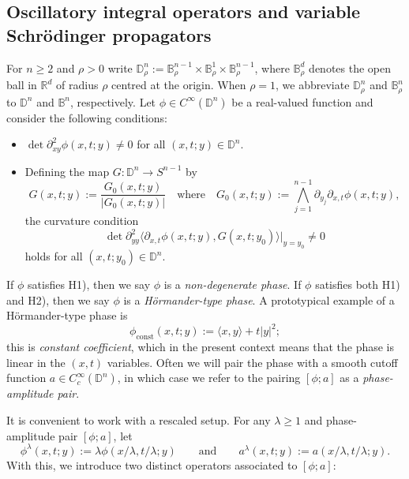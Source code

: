 \documentclass[reqno]{amsart}
\numberwithin{equation}{section}
\newcommand{\B}{\mathbb{B}}
\newcommand{\D}{\mathbb{D}}
\newcommand{\R}{\mathbb{R}}
\def\inn#1#2{\langle#1,#2\rangle}
\theoremstyle{plain}
\theoremstyle{definition}
\begin{document}
\subsection{Oscillatory integral operators and variable Schr\"odinger propagators}%
For $n \geq 2$ and $\rho > 0$ write $\D^n_{\rho}:= \B_{\rho}^{n-1} \times \B^1_{\rho} \times \B_{\rho}^{n-1}$, where  $\B^d_{\rho}$ denotes the open ball in $\R^d$ of radius $\rho$ centred at the origin. When $\rho = 1$, we abbreviate $\D^n_{\rho}$ and $\B^n_{\rho}$ to $\D^n$ and $\B^n$, respectively.  Let $\phi \in C^{\infty}(\D^n)$ be a real-valued function and consider the following conditions:
\begin{itemize}
\item[H1)] $\det \partial_{x y}^2 \phi(x,t;y) \neq 0$ for all $(x,t;y) \in \D^n$.
\item[H2)] Defining the map $G \colon \D^n \to S^{n-1}$ by 
\begin{equation}\label{eq: Gauss map}
G(x,t;y) := \frac{G_0(x,t;y)}{|G_0(x,t;y) |} \quad \textrm{where} \quad G_0(x,t;y) := \bigwedge_{j=1}^{n-1} \partial_{y_j} \partial_{x,t}\phi(x,t;y),
\end{equation}
the curvature condition
\begin{equation*}
\det \partial^2_{y y} \langle \partial_{x,t}\phi(x,t;y),G(x, t; y_0)\rangle|_{y = y_0} \neq 0
\end{equation*}
holds for all $(x,t; y_0) \in \D^n$.
\end{itemize}
If $\phi$ satisfies H1), then we say $\phi$ is a \textit{non-degenerate phase}. If $\phi$ satisfies both H1) and H2), then we say $\phi$ is a \textit{H\"ormander-type phase}. A prototypical example of a H\"ormander-type phase is 
\begin{equation}\label{eq: prototype}
    \phi_{\mathrm{const}}(x,t;y) := \inn{x}{y} + t|y|^2;
\end{equation}
this is \textit{constant coefficient}, which in the present context means that the phase is linear in the $(x,t)$ variables. Often we will pair the phase with a smooth cutoff function $a \in C_c^{\infty}(\D^n)$, in which case we refer to the pairing $[\phi; a]$ as a \textit{phase-amplitude pair}. 

It is convenient to work with a rescaled setup. For any $\lambda \geq 1$ and phase-amplitude pair $[\phi; a]$, let 
\begin{equation*}
  \phi^{\lambda}(x,t;y) :=\lambda\phi(x/\lambda, t/\lambda;y) \qquad \textrm{and} \qquad   a^{\lambda}(x, t; y) := a(x/\lambda, t/\lambda; y).
\end{equation*}
With this, we introduce two distinct operators associated to $[\phi; a]$:
\end{document}
